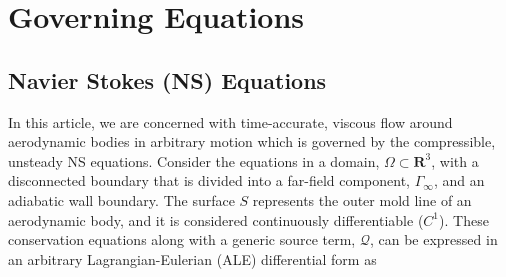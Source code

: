 
\section{Governing Equations}
\label{sec:govEq}
\subsection{Navier Stokes (NS) Equations}
In this article, we are concerned with time-accurate, viscous flow around aerodynamic bodies in arbitrary motion which is governed by the compressible, unsteady NS equations. Consider the equations in a domain, $\Omega \subset \mathbf{R}^3$, with a disconnected boundary that is divided into a far-field component, $\Gamma_\infty$, and an adiabatic wall boundary. The surface $S$ represents the outer mold line of an aerodynamic body, and it is considered continuously differentiable ($C^1$). These conservation equations along with a generic source term, $\mathcal{Q} $, can be expressed in an arbitrary Lagrangian-Eulerian (ALE) differential form as

